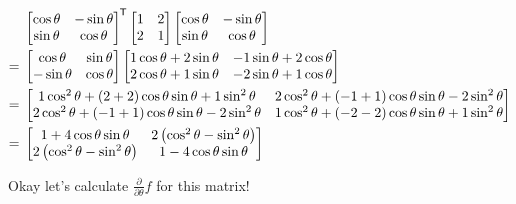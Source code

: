 \documentclass[11pt, oneside]{amsart}
\newcommand{\fpartial}[2]{\frac{\partial #1}{\partial #2}}
\newcommand*{\tran}{^{\mkern-1.5mu\mathsf{T}}}
\newcommand{\fptheta}{\fpartial{}{\theta}}
\begin{document}
\begin{equation*}
  \begin{split}
      &\begin{bmatrix}
        \cos\theta & -\sin\theta \\
        \sin\theta & \cos\theta
      \end{bmatrix}\tran
      \begin{bmatrix}
        1 & 2 \\
        2 & 1
      \end{bmatrix}
      \begin{bmatrix}
        \cos\theta & -\sin\theta \\
        \sin\theta & \cos\theta
      \end{bmatrix}
    \\
    ={}&
      \begin{bmatrix}
        \cos\theta  & \sin\theta \\
        -\sin\theta & \cos\theta
      \end{bmatrix}
      \begin{bmatrix}
        1\cos\theta + 2\sin\theta & -1\sin\theta + 2\cos\theta \\
        2\cos\theta + 1\sin\theta & -2\sin\theta + 1\cos\theta
      \end{bmatrix}
    \\
    ={}&
      \begin{bmatrix}
        1 \cos^2\theta + (2 + 2) \cos\theta \sin\theta + 1 \sin^2\theta
        &
        2 \cos^2\theta + (-1 + 1) \cos\theta \sin\theta - 2\sin^2\theta
        \\
        2 \cos^2\theta + (-1 + 1) \cos\theta \sin\theta - 2\sin^2\theta
        &
        1\cos^2\theta + (-2 - 2) \cos\theta\sin\theta + 1\sin^2\theta
      \end{bmatrix}
    \\
    ={}&
      \begin{bmatrix}
        1 + 4\cos\theta\sin\theta
        &
        2 \left( \cos^2\theta - \sin^2\theta \right)
        \\
        2 \left( \cos^2\theta - \sin^2\theta \right)
        &
        1 - 4\cos\theta\sin\theta
      \end{bmatrix}
    \end{split}
\end{equation*}

Okay let's calculate $\fptheta f$ for this matrix!
\end{document}
